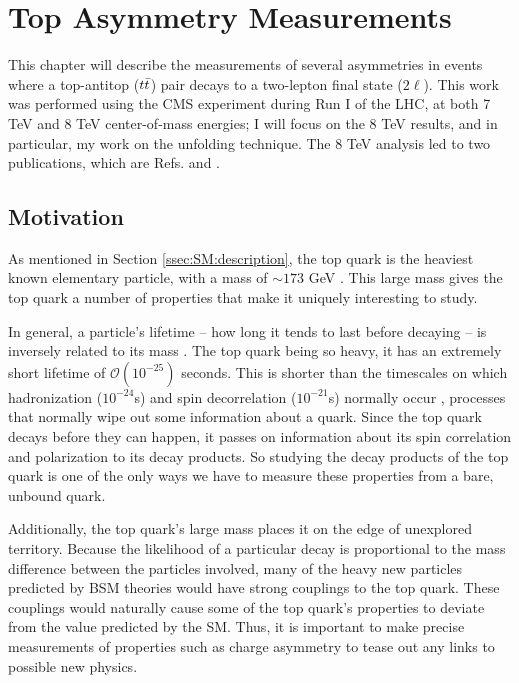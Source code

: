 \chapter{Top Asymmetry Measurements}
\label{chap:afb}

This chapter will describe the measurements of several asymmetries in
events where a top-antitop ($t\bar{t}$) pair decays to a two-lepton
final state ($2\ell$). This work was performed using the CMS
experiment during Run I of the LHC, at both 7 TeV and 8 TeV
center-of-mass energies;
I will focus on the 8 TeV results, and in particular, my work on the
unfolding technique. The 8 TeV analysis led to two publications, which
are Refs. \cite{chargeasym} and \cite{spincorrpol}.


\section{Motivation}
\label{sec:afb:motivation}

As mentioned in Section \ref{ssec:SM:description}, the top quark is the
heaviest known elementary particle, with a mass of $\sim 173$ GeV
\cite{pdg}. This large mass gives the top quark a number of properties
that make it uniquely interesting to study.

In general, a particle's lifetime -- how long it tends to last before
decaying -- is inversely related to its mass \cite{griffiths}.
The top quark being so heavy, it has an extremely short lifetime
of $\mathcal{O} (10^{-25})$ seconds. This is shorter than the timescales on
which hadronization ($10^{-24}$s) and spin decorrelation ($10^{-21}$s)
normally occur \cite{pdg,spindecorrelation}, processes that normally
wipe out some information about a quark. Since the top quark decays
before they can happen, it passes on information about its spin
correlation and polarization to its decay products. So studying the decay
products of the top quark is one of the only ways we have to measure
these properties from a bare, unbound quark.

Additionally, the top quark's large mass places it on the edge of
unexplored territory. Because the likelihood of a particular decay is
proportional to the mass difference between the particles involved,
many of the heavy new particles predicted by BSM theories would have strong
couplings to the top quark.
These couplings would naturally cause some of the top quark's
properties to deviate from the value predicted by the SM. Thus, it is
important to make precise measurements of properties such as charge
asymmetry to tease out any links to possible new physics.

